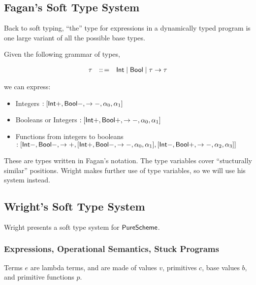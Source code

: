 \documentclass{article}
\begin{document}
\subsection*{Fagan's Soft Type System}

Back to soft typing, ``the'' type for expressions in a dynamically typed program
 is one large variant of all the possible base types.

Given the following grammar of types,

\[\begin{array}{l c l}
  \tau & ::\,= & \mathsf{Int} \mid \mathsf{Bool} \mid \tau \rightarrow \tau
  \end{array}\]

we can express:
\begin{itemize}
\item
  Integers $: [\mathsf{Int} +, \mathsf{Bool} -, \rightarrow -, \alpha_0, \alpha_1]$
\item
  Booleans or Integers $: [\mathsf{Int} +, \mathsf{Bool} +, \rightarrow -, \alpha_0, \alpha_1]$
\item
  Functions from integers to booleans $: [\mathsf{Int} -, \mathsf{Bool} -, \rightarrow +, [\mathsf{Int} +, \mathsf{Bool} -, \rightarrow -, \alpha_0, \alpha_1], [\mathsf{Int} -, \mathsf{Bool} +, \rightarrow -, \alpha_2, \alpha_3]]$
\end{itemize}

These are types written in Fagan's notation.
The type variables cover ``stucturally similar'' positions.
Wright makes further use of type variables, so we will use his system instead.



\subsection*{Wright's Soft Type System}

Wright presents a soft type system for $\mathsf{PureScheme}{}$.

\subsubsection*{Expressions, Operational Semantics, Stuck Programs}
Terms $e$ are lambda terms, and are made of values $v$, primitives $c$, base
 values $b$, and primitive functions $p$.
\end{document}
